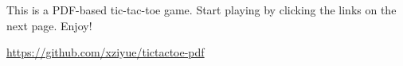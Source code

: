 \documentclass{article}
\begin{document}
 \par
\vspace*{2em}
This is a PDF-based tic-tac-toe game. Start playing by clicking the
links on the next page. Enjoy!\par
\vspace*{2em}
\centering \url{https://github.com/xziyue/tictactoe-pdf} \par

\clearpage

\end{document}
